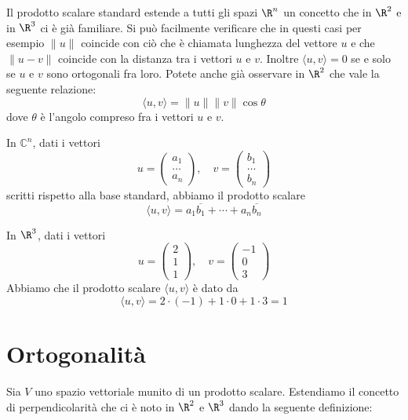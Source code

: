 \begin{observation}
	Il prodotto scalare standard estende a tutti gli spazi $\R^n$ un concetto
	che in $\R^2$ e in $\R^3$ ci è già familiare. Si può
	facilmente verificare che in questi casi per esempio $\| u \|$ coincide con
	ciò che è chiamata lunghezza del vettore $u$ e che $\| u - v \|$ coincide
	con la distanza tra i vettori $u$ e $v$. Inoltre $\langle u, v \rangle = 0$ se
	e solo se $u$ e $v$ sono ortogonali fra loro. Potete anche già osservare in
	$\R^2$ che vale la seguente relazione:
	\[
		\langle u, v \rangle = \| u \| \| v \| \cos \theta
	\]
	dove $\theta$ è l'angolo compreso fra i vettori $u$ e $v$.
\end{observation}

\begin{example}
	In $\mathbb{C}^n$, dati i vettori
	\[
		u = \begin{pmatrix}
			a_1 \\ \dots \\ a_n
		\end{pmatrix}, \quad
		v = \begin{pmatrix}
			b_1 \\ \dots \\ b_n
		\end{pmatrix}
	\]
	scritti rispetto alla base standard, abbiamo il prodotto scalare
	\[
		\langle u, v \rangle = a_1 \overline{b_1} + \cdots + a_n \overline{b_n}
	\]
\end{example}

\begin{example}
	In $\R^3$, dati i vettori
	\[
		u = \begin{pmatrix}
			2 \\ 1 \\ 1
		\end{pmatrix}, \quad
		v = \begin{pmatrix}
			-1 \\ 0 \\ 3
		\end{pmatrix}
	\]
	Abbiamo che il prodotto scalare $\langle u, v \rangle$ è dato da
	\[
		\langle u, v \rangle = 2 \cdot (-1) + 1 \cdot 0 + 1 \cdot 3 = 1
	\]
\end{example}

\section{Ortogonalità}
Sia $V$ uno spazio vettoriale munito di un prodotto scalare. Estendiamo il
concetto di perpendicolarità che ci è noto in $\R^2$ e
$\R^3$ dando la seguente definizione:

